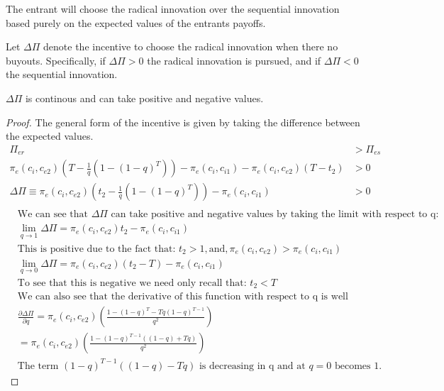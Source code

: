 The entrant will choose the radical innovation over the sequential innovation based purely on the expected values of the entrants payoffs.

\begin{definition}
Let $\Delta \Pi$ denote the incentive to choose the radical innovation when there no buyouts. Specifically, if $\Delta \Pi >0$ the radical innovation is pursued, and if $\Delta \Pi <0$ the sequential innovation. 
\end{definition}

\begin{proposition}
$\Delta \Pi$ is continous and can take positive and negative values. 
\end{proposition}

\begin{proof}
The general form of the incentive is given by taking the difference between the expected values. 
\begin{align*}
\Pi_{er}  &> \Pi_{es}   \\
\pi_{e}(c_i,c_{e2}) \left( T - \frac{1}{q} \left( 1-(1-q)^{T} \right) \right) - \pi_e(c_i,c_{i1})  -\pi_e(c_i,c_{e2})(T-t_2) &> 0 \\
\Delta \Pi \equiv \pi_{e}(c_i,c_{e2}) \left( t_2 - \frac{1}{q} \left( 1-(1-q)^{T} \right) \right) - \pi_e(c_i,c_{i1})  &> 0 \\
\end{align*}
\begin{align*}
&\text{We can see that } \Delta \Pi \text{ can take positive and negative values by taking the limit with respect to q:} \\
&\lim_{q \to 1}\Delta \Pi = \pi_{e}(c_i,c_{e2}) t_2  - \pi_e(c_i,c_{i1}) \\
& \text{This is positive due to the fact that: } t_2>1, \text{and}, \pi_{e}(c_i,c_{e2})>\pi_e(c_i,c_{i1}) \\
&\lim_{q \to 0}\Delta \Pi = \pi_{e}(c_i,c_{e2}) (t_2 - T)- \pi_e(c_i,c_{i1}) \\
& \text{To see that this is negative we need only recall that: } t_2<T \\
& \text{We can also see that the derivative of this function with respect to q is well defined and positive:} \\
&\frac{\partial \Delta \Pi}{\partial q} = \pi_{e}(c_i,c_{e2})  \left(\frac{1-(1-q)^T-T q (1-q)^{T-1}}{q^2} \right) \\
& = \pi_{e}(c_i,c_{e2})  \left(\frac{1-(1-q)^{T-1}((1-q)+T q) }{q^2} \right) \\
& \text{The term } (1-q)^{T-1}((1-q)-T q) \text{ is decreasing in q and at } q=0 \text{ becomes } 1. 
\end{align*}  
\end{proof}

